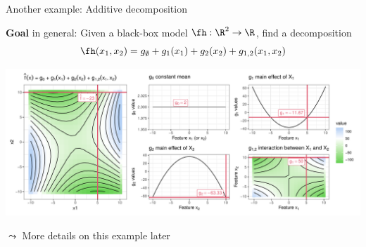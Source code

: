 \documentclass[11pt,compress,t,notes=noshow, aspectratio=169, xcolor=table]{beamer}
\newcommand{\open}{}
\newcommand{\close}{}
\begin{document}
\begin{frame}{Another example: Additive decomposition}

    \textbf{Goal} in general:
    Given a black-box model \(\fh: \R^2 \to \R\), find a decomposition
    \begin{equation}
        \fh(x_1, x_2) =  g_\emptyset + g_1(x_1) + g_2(x_2) + g_{\open 1, 2 \close}(x_1, x_2)
    \end{equation}
    

    \pause
    \begin{example}
    
    
    \includegraphics[width = \textwidth]{figure/decomposition}
    
    $\leadsto$ More details on this example later
        
    \end{example}
    
\end{frame}
\end{document}

